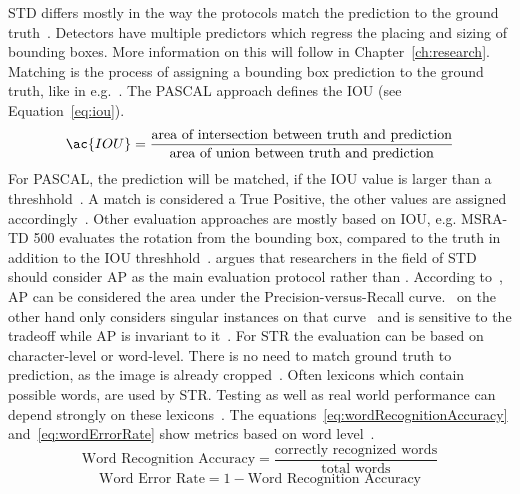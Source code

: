 \ac{STD} differs mostly in the way the protocols match the prediction to the ground
truth~\citep{long_scene_2021}.
Detectors have multiple predictors which regress the placing and sizing of bounding boxes.
More information on this will follow in Chapter~\ref{ch:research}.
Matching is the process of assigning a bounding box prediction to the ground
truth, like in e.g.~\cite{liu_ssd_2016,liao_textboxes_2018}.
The PASCAL approach defines the \ac{IOU} (see Equation~\ref{eq:iou}).
\begin{equation}\label{eq:iou}
    \ac{IOU}=
            \frac{\text{area of intersection between truth and prediction}}{\text{area of union
            between truth and prediction}}
\end{equation}
For PASCAL, the prediction will be matched, if the \ac{IOU} value is larger than a
threshhold~\citep{long_scene_2021}.
A match is considered a True Positive, the other values are assigned
accordingly~\citep{sun_icdar_2019}.
Other evaluation approaches are mostly based on \ac{IOU}, e.g. MSRA-TD 500 evaluates the rotation
from the bounding box, compared to the truth in addition to the \ac{IOU}
threshhold~\citep{long_scene_2021}.
\cite{long_scene_2021} argues that researchers in the field of \ac{STD} should consider \ac{AP}
as the main evaluation protocol rather than \fone.
According to~\cite{su_relationship_2015}, \ac{AP} can be considered the area under the
Precision-versus-Recall curve.
\fone\ on the other hand only considers singular instances on that curve~\citep{long_scene_2021} and
is sensitive to the tradeoff while \ac{AP} is invariant to it~\citep{shi_icdar2017_2017}.
For \ac{STR} the evaluation can be based on character-level or word-level.
There is no need to match ground truth to prediction, as the image is already
cropped~\citep{long_scene_2021}.
Often lexicons which contain possible words, are used by \ac{STR}.
Testing as well as real world performance can depend strongly on these
lexicons~\citep{chen_text_2021,long_scene_2021}.
The equations~\ref{eq:wordRecognitionAccuracy} and~\ref{eq:wordErrorRate} show metrics based on
word level~\citep{chen_text_2021}.
\begin{equation}\label{eq:wordRecognitionAccuracy}
\text{Word Recognition Accuracy} = \frac{\text{correctly recognized words}}{\text{total words}}
\end{equation}
\begin{equation}\label{eq:wordErrorRate}
    \text{Word Error Rate} = 1 - \text{Word Recognition Accuracy}
\end{equation}
